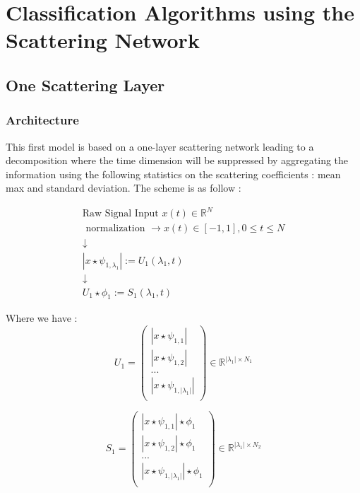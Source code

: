 \documentclass[a4paper]{report}
\begin{document}
\chapter{Classification Algorithms using the Scattering Network}
\section{One Scattering Layer}
\subsection{Architecture}

This first model is based on a one-layer scattering network leading to a decomposition where the time dimension will be suppressed by aggregating the information using the following statistics on the scattering coefficients : mean max and standard deviation.
The scheme is as follow :

\begin{equation}
\begin{matrix}
\text{Raw Signal Input } x(t) \in \mathbb{R}^N \\
\text{ normalization } \rightarrow x(t) \in  [-1,1], 0 \leq t \leq N \\
\downarrow \\
 | x \star \psi_{1,\lambda_1}  |:= U_1(\lambda_1,t)\\
\downarrow \\
U_1 \star \phi_1 := S_1(\lambda_1,t)
\end{matrix}
\end{equation}

Where we have :\\ 
\[
U_1=\left( \begin{matrix}
|x\star \psi_{1,1} | \\
|x\star \psi_{1,2} | \\
... \\
|x\star \psi_{1,|\lambda_1|} |\\
\end{matrix}
\right)
\in \mathbb{R}^{|\lambda_1|\times N_1}
\]

\[
S_1=\left( \begin{matrix}
|x\star \psi_{1,1} | \star \phi_1 \\
|x\star \psi_{1,2} | \star \phi_1  \\
... \\
|x\star \psi_{1,|\lambda_1|} | \star \phi_1 \\
\end{matrix}
\right)
\in \mathbb{R}^{|\lambda_1|\times N_2}
\]
\end{document}
